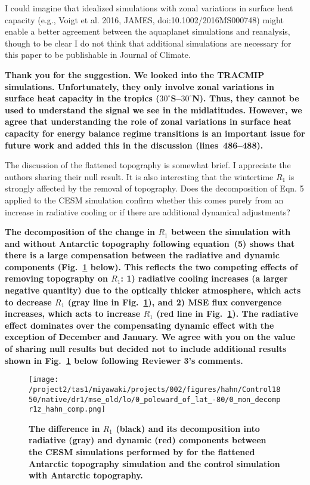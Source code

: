\documentclass{article}
\begin{document}
I could imagine that idealized simulations with zonal variations in surface heat capacity (e.g., Voigt et al. 2016, JAMES, doi:10.1002/2016MS000748) might enable a better agreement between the aquaplanet simulations and reanalysis, though to be clear I do not think that additional simulations are necessary for this paper to be publishable in Journal of Climate.

\textbf{Thank you for the suggestion. We looked into the TRACMIP simulations. Unfortunately, they only involve zonal variations in surface heat capacity in the tropics ($30^\circ$S--$30^\circ$N). Thus, they cannot be used to understand the signal we see in the midlatitudes. However, we agree that understanding the role of zonal variations in surface heat capacity for energy balance regime transitions is an important issue for future work and added this in the discussion (lines~486--488).}

The discussion of the flattened topography is somewhat brief. I appreciate the authors sharing their null result. It is also interesting that the wintertime $R_1$ is strongly affected by the removal of topography. Does the decomposition of Eqn. 5 applied to the CESM simulation confirm whether this comes purely from an increase in radiative cooling or if there are additional dynamical adjustments?

\textbf{The decomposition of the change in $R_1$ between the simulation with and without Antarctic topography following equation~(5) shows that there is a large compensation between the radiative and dynamic components (Fig.~\ref{fig:hahn-decomp} below). This reflects the two competing effects of removing topography on $R_1$: 1) radiative cooling increases (a larger negative quantity) due to the optically thicker atmosphere, which acts to decrease $R_1$ (gray line in Fig.~\ref{fig:hahn-decomp}), and 2) MSE flux convergence increases, which acts to increase $R_1$ (red line in Fig.~\ref{fig:hahn-decomp}). The radiative effect dominates over the compensating dynamic effect with the exception of December and January. We agree with you on the value of sharing null results but decided not to include additional results shown in Fig.~\ref{fig:hahn-decomp} below following Reviewer 3's comments.}

\begin{figure}[!h]
  \noindent\texttt{[image: /project2/tas1/miyawaki/projects/002/figures/hahn/Control1850/native/dr1/mse\_old/lo/0\_poleward\_of\_lat\_-80/0\_mon\_decompr1z\_hahn\_comp.png]}
  \caption{\bf The difference in $R_1$ (black) and its decomposition into radiative (gray) and dynamic (red) components between the CESM simulations performed by \cite{hahn2020} for the flattened Antarctic topography simulation and the control simulation with Antarctic topography.}
  \label{fig:hahn-decomp}
\end{figure}
\end{document}
